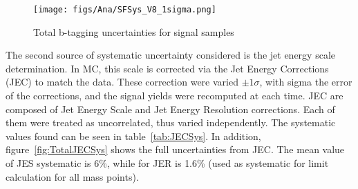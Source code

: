 \begin{table*}[htbH]
\begin{center}
\caption{B-tagging uncertainties for signal samples\label{tab:SFSys}}
\end{center}
\end{table*}

\begin{figure}[!Hhtbp]
  \begin{center}
    \texttt{[image: figs/Ana/SFSys\_V8\_1sigma.png]}
    \caption{Total b-tagging uncertainties for signal samples}
    \label{fig:TotalSFSys}
  \end{center}
\end{figure}

The second source of systematic uncertainty considered is the jet energy scale determination. In MC, this scale is corrected via the Jet Energy Corrections (JEC) to match the data. These correction were varied $\pm 1\sigma$, with sigma the error of the corrections, and the signal yields were recomputed at each time. JEC are composed of Jet Energy Scale and Jet Energy Resolution corrections. Each of them were treated as uncorrelated, thus varied independently. The systematic values found can be seen in table~\ref{tab:JECSys}. In addition, figure~\ref{fig:TotalJECSys} shows the full uncertainties from JEC. The mean value of JES systematic is 6\%, while for JER is 1.6\% (used as systematic for limit calculation for all mass points).

